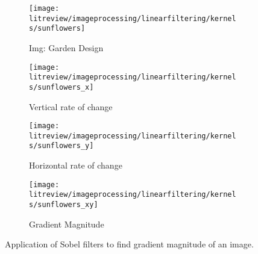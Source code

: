   \begin{figure}[H]
    \centering
    \begin{subfigure}[b]{0.45\textwidth}
        \texttt{[image: litreview/imageprocessing/linearfiltering/kernels/sunflowers]}
        \caption{Img: Garden Design}
    \end{subfigure}
    \begin{subfigure}[b]{0.45\textwidth}
        \texttt{[image: litreview/imageprocessing/linearfiltering/kernels/sunflowers\_x]}
        \caption{Vertical rate of change}
        \label{fig:vert}
    \end{subfigure}
    \begin{subfigure}[b]{0.45\textwidth}
        \texttt{[image: litreview/imageprocessing/linearfiltering/kernels/sunflowers\_y]}
        \caption{Horizontal rate of change}
        \label{fig:hoz}
    \end{subfigure}
    \begin{subfigure}[b]{0.45\textwidth}
        \texttt{[image: litreview/imageprocessing/linearfiltering/kernels/sunflowers\_xy]}
        \caption{Gradient Magnitude}
        \label{fig:hoz}
    \end{subfigure}
    \caption{Application of Sobel filters to find gradient magnitude of an image.}
    \label{fig:sobel_apply2}
  \end{figure}